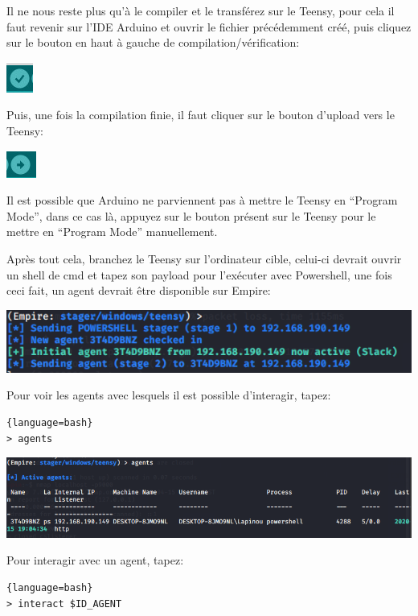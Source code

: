 Il ne nous reste plus qu’à le compiler et le transférez sur le Teensy, pour cela il faut 
revenir sur l’IDE Arduino et ouvrir le fichier précédemment créé, puis cliquez sur le bouton en haut à gauche de compilation/vérification:

\includegraphics[scale=0.8]{images/SEN_Projet_Image010.jpeg}

Puis, une fois la compilation finie, il faut cliquer sur le bouton d’upload vers le Teensy:

\includegraphics[scale=0.8]{images/SEN_Projet_Image011.jpeg}

Il est possible que Arduino ne parviennent pas à mettre le Teensy en “Program Mode”, dans ce cas là, appuyez sur 
le bouton présent sur le Teensy pour le mettre en “Program Mode” manuellement.

Après tout cela, branchez le Teensy sur l’ordinateur cible, celui-ci devrait ouvrir un shell de cmd et tapez 
son payload pour l'exécuter avec Powershell, une fois ceci fait, un agent devrait être disponible sur Empire:

\includegraphics[scale=0.8]{images/SEN_Projet_Image07.png}

Pour voir les agents avec lesquels il est possible d'interagir, tapez:

\begin{lstlisting}{language=bash}
> agents
\end{lstlisting}

\includegraphics[scale=0.5]{images/SEN_Projet_Image08.png}

Pour interagir avec un agent, tapez:

\begin{lstlisting}{language=bash}
> interact $ID_AGENT
\end{lstlisting}

